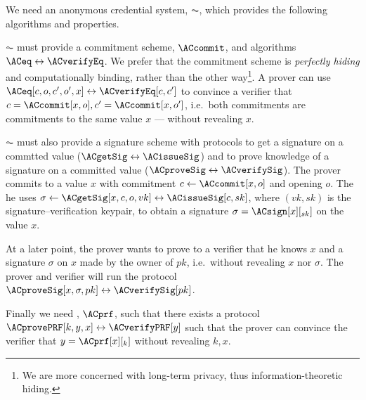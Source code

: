 
We need an anonymous credential system, \(\AC\), which provides the following 
algorithms and properties.


\(\AC\) must provide a commitment scheme, \(\ACcommit\), and algorithms 
\(\ACeq\leftrightarrow \ACverifyEq\).
We prefer that the commitment scheme is \emph{perfectly hiding} and 
computationally binding, rather than the other way\footnote{%
  We are more concerned with long-term privacy, thus information-theoretic 
  hiding.
}.
A prover can use \(\ACeq[c, o, c', o', x]\leftrightarrow \ACverifyEq[c, c']\) to 
convince a verifier that \(c = \ACcommit[x, o], c' = \ACcommit[x, o']\), i.e.\ 
both commitments are commitments to the same value \(x\) --- without revealing 
\(x\).



\(\AC\) must also provide a signature scheme with protocols to get a signature 
on a commtted value (\(\ACgetSig\leftrightarrow \ACissueSig\)) and to prove 
knowledge of a signature on a committed value (\(\ACproveSig\leftrightarrow 
  \ACverifySig\)).
The prover commits to a value \(x\) with commitment \(c\gets \ACcommit[x, o]\) 
and opening \(o\).
The he uses \(\sigma\gets \ACgetSig[x, c, o, vk]\leftrightarrow \ACissueSig[c, 
  sk]\), where \((vk, sk)\) is the signature--verification keypair, to obtain a 
signature \(\sigma = \ACsign[x][_{sk}]\) on the value \(x\).

At a later point, the prover wants to prove to a verifier that he knows \(x\) 
and a signature \(\sigma\) on \(x\) made by the owner of \(pk\), i.e.\ without 
revealing \(x\) nor \(\sigma\).
The prover and verifier will run the protocol \(\ACproveSig[x, \sigma, 
  pk]\leftrightarrow \ACverifySig[pk]\).


Finally we need , \(\ACprf\), such that there exists a protocol 
\(\ACprovePRF[k, y, x]\leftrightarrow \ACverifyPRF[y]\) such that the prover can 
convince the verifier that \(y = \ACprf[x][_k]\) without revealing \(k, x\).

